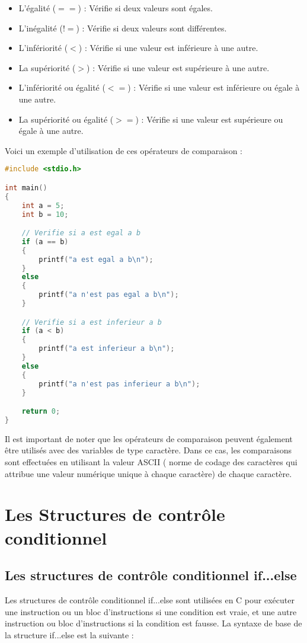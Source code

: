 \documentclass{uofa-eng-assignment}
\begin{document}
\begin{itemize}
    \item L'égalité ($==$) : Vérifie si deux valeurs sont égales.
    \item L'inégalité ($!=$) : Vérifie si deux valeurs sont différentes.
    \item L'infériorité ($<$) : Vérifie si une valeur est inférieure à une autre.
    \item La supériorité ($>$) : Vérifie si une valeur est supérieure à une autre.
    \item L'infériorité ou égalité ($<=$) : Vérifie si une valeur est inférieure ou égale à une autre.
    \item La supériorité ou égalité ($>=$) : Vérifie si une valeur est supérieure ou égale à une autre.
\end{itemize}

\noindent \newline
Voici un exemple d'utilisation de ces opérateurs de comparaison :

\begin{lstlisting}[language=C]
#include <stdio.h>

int main()
{
    int a = 5;
    int b = 10;

    // Verifie si a est egal a b
    if (a == b)
    {
        printf("a est egal a b\n");
    }
    else
    {
        printf("a n'est pas egal a b\n");
    }

    // Verifie si a est inferieur a b
    if (a < b)
    {
        printf("a est inferieur a b\n");
    }
    else
    {
        printf("a n'est pas inferieur a b\n");
    }

    return 0;
}

\end{lstlisting}

\noindent \newline
Il est important de noter que les opérateurs de comparaison peuvent également être utilisés avec des variables de type caractère. Dans ce cas, les comparaisons sont effectuées en utilisant la valeur ASCII ( norme de codage des caractères qui attribue une valeur numérique unique à chaque caractère) de chaque caractère.

\section{Les Structures de contrôle conditionnel}
\subsection{Les structures de contrôle conditionnel if...else}
Les structures de contrôle conditionnel if...else sont utilisées en C pour exécuter une instruction ou un bloc d'instructions si une condition est vraie, et une autre instruction ou bloc d'instructions si la condition est fausse. La syntaxe de base de la structure if...else est la suivante :
\end{document}

